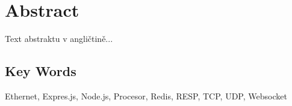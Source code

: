\chapter*{Abstract}
Text abstraktu v angličtině...

\vfill
\section*{Key Words}
Ethernet, Expres.js, Node.js, Procesor, Redis, RESP, TCP, UDP, Websocket